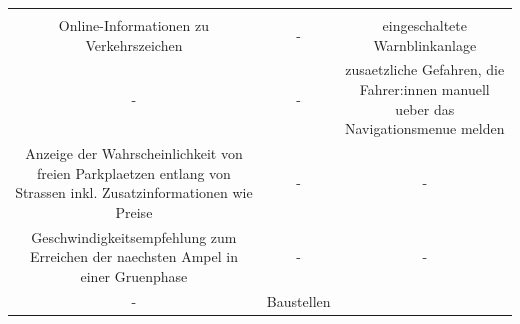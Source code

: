 \documentclass[
]{book}
\begin{document}
\begin{longtable}[]{@{}ccc@{}}
\begin{minipage}[t]{0.30\columnwidth}
\end{minipage}\tabularnewline
\begin{minipage}[t]{0.30\columnwidth}\centering
Online-Informationen zu Verkehrszeichen\strut
\end{minipage} & \begin{minipage}[t]{0.30\columnwidth}\centering
-\strut
\end{minipage} & \begin{minipage}[t]{0.30\columnwidth}\centering
eingeschaltete Warnblinkanlage\strut
\end{minipage}\tabularnewline
\begin{minipage}[t]{0.30\columnwidth}\centering
-\strut
\end{minipage} & \begin{minipage}[t]{0.30\columnwidth}\centering
-\strut
\end{minipage} & \begin{minipage}[t]{0.30\columnwidth}\centering
zusaetzliche Gefahren, die Fahrer:innen manuell ueber das Navigationsmenue melden\strut
\end{minipage}\tabularnewline
\begin{minipage}[t]{0.30\columnwidth}\centering
Anzeige der Wahrscheinlichkeit von freien Parkplaetzen entlang von Strassen inkl. Zusatzinformationen wie Preise\strut
\end{minipage} & \begin{minipage}[t]{0.30\columnwidth}\centering
-\strut
\end{minipage} & \begin{minipage}[t]{0.30\columnwidth}\centering
-\strut
\end{minipage}\tabularnewline
\begin{minipage}[t]{0.30\columnwidth}\centering
Geschwindigkeitsempfehlung zum Erreichen der naechsten Ampel in einer Gruenphase\strut
\end{minipage} & \begin{minipage}[t]{0.30\columnwidth}\centering
-\strut
\end{minipage} & \begin{minipage}[t]{0.30\columnwidth}\centering
-\strut
\end{minipage}\tabularnewline
\begin{minipage}[t]{0.30\columnwidth}\centering
-\strut
\end{minipage} & \begin{minipage}[t]{0.30\columnwidth}\centering
Baustellen\strut
\end{minipage} & \begin{minipage}[t]{0.30\columnwidth}\centering

\end{minipage}
\end{longtable}
\end{document}
